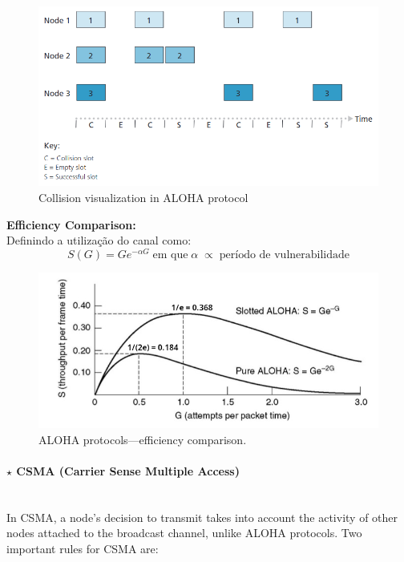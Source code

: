 \begin{figure}[H]
    \centering
    \includegraphics[width = 0.75\linewidth]{img/5/ALOHA.png}
    \caption{Collision visualization in ALOHA protocol}
    \label{fig:ALOHA}
\end{figure}

\noindent\textbf{Efficiency Comparison:}\mbox{}\\[2pt]
\noindent Definindo a utilização do canal como:
$$
    S(G) = G e^{-\alpha G}\; \text{em que}\; \alpha\; \propto\; \text{período de vulnerabilidade}
$$

\vspace{-1em}
\begin{figure}[H]
    \centering
    \includegraphics[width = 0.7\linewidth]{img/5/Efficiency-ALOHA.png}
    \caption{ALOHA protocols---efficiency comparison.}
    \label{fig:efficiency-ALOHA}
\end{figure}

\newpage
\paragraph[5.3.2.2 CSMA (Carrier Sense Multiple Access)]{$\pmb{\star}$ CSMA (Carrier Sense Multiple Access)}\mbox{}\\[4pt]
In CSMA, a node’s decision to transmit takes into account the activity of other nodes attached to the broadcast channel, unlike ALOHA protocols. Two important rules for CSMA are:

